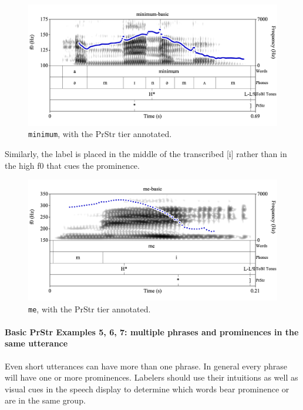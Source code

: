 \documentclass[11pt, twoside]{memoir}
\def\textlabel#1{{\relsize{-.5}\fontspec[Mapping=tex-text]{Roboto Mono}{#1}}}
\begin{document}
\begin{figure}[H]
\centering
%
\includegraphics[width=.875\linewidth]{PrStr-minimum-basic.png}
%
\caption{\texttt{minimum}, with the PrStr tier annotated.%
\label{fig:minimum PrStr}%
%
}
\end{figure}

Similarly, the \textlabel{*} label is placed in the middle of the transcribed [i] rather than in the high f0 that cues the prominence. 

\begin{figure}[H]
\centering
%
\includegraphics[width=.875\linewidth]{PrStr-me-basic.png}
%
\caption{\texttt{me}, with the PrStr tier annotated.%
\label{fig:me PrStr}%
%
}
\end{figure}

\paragraph{Basic PrStr Examples 5, 6, 7: multiple phrases and prominences in the same utterance}

Even short utterances can have more than one phrase. In general every phrase will have one or more prominences.  Labelers should use their intuitions as well as visual cues in the speech display to determine which words bear prominence or are in the same group.
\end{document}
